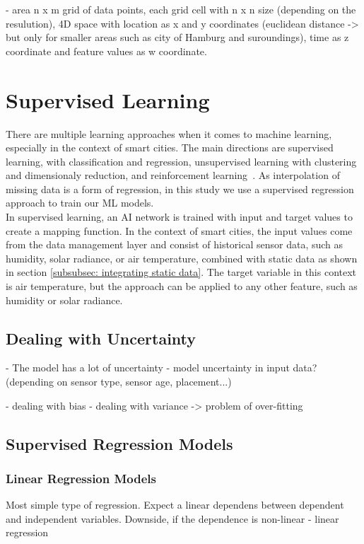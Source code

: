 - area n x m grid of data points, each grid cell with n x n size (depending on the resulution), 4D space with location as x and y coordinates (euclidean distance -> but only for smaller areas such as city of Hamburg and suroundings), time as z coordinate and feature values as w coordinate.\\






\section{Supervised Learning}
There are multiple learning approaches when it comes to machine learning, especially in the context of smart cities. The main directions are supervised learning, with classification and regression, unsupervised learning with clustering and dimensionaly reduction, and reinforcement learning~\cite{ullah2020applications}. As interpolation of missing data is a form of regression, in this study we use a supervised regression approach to train our ML models.\\
In supervised learning, an AI network is trained with input and target values to create a mapping function. In the context of smart cities, the input values come from the data management layer and consist of historical sensor data, such as humidity, solar radiance, or air temperature, combined with static data as shown in section \ref{subsubsec: integrating static data}. The target variable in this context is air temperature, but the approach can be applied to any other feature, such as humidity or solar radiance.

\subsection{Dealing with Uncertainty}
- The model has a lot of uncertainty
- model uncertainty in input data? (depending on sensor type, sensor age, placement...)

- dealing with bias
- dealing with variance
-> problem of over-fitting

\subsection{Supervised Regression Models}

\subsubsection{Linear Regression Models}
Most simple type of regression. Expect a linear dependens between dependent and independent variables. Downside, if the dependence is non-linear
- linear regression

